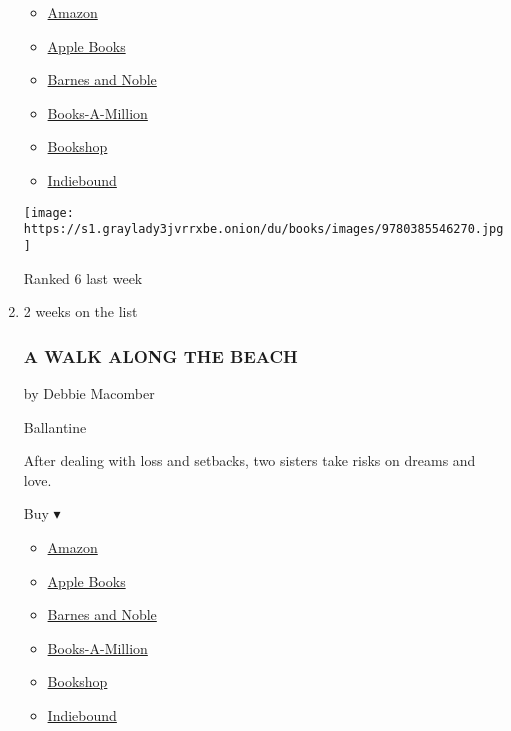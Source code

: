 \begin{enumerate}
  \begin{itemize}
  \tightlist
  \item
    \href{https://www.amazon.com/dp/0385546270?tag=NYTBSREV-20\&tag=NYTBS-20}{Amazon}
  \item
    \href{https://du-gae-books-dot-nyt-du-prd.appspot.com/buy?title=SEX+AND+VANITY\&author=Kevin+Kwan}{Apple
    Books}
  \item
    \href{https://www.anrdoezrs.net/click-7990613-11819508?url=https\%3A\%2F\%2Fwww.barnesandnoble.com\%2Fw\%2F\%3Fean\%3D9780385546270}{Barnes
    and Noble}
  \item
    \href{https://www.anrdoezrs.net/click-7990613-35140?url=https\%3A\%2F\%2Fwww.booksamillion.com\%2Fp\%2FSEX\%2BAND\%2BVANITY\%2FKevin\%2BKwan\%2F9780385546270}{Books-A-Million}
  \item
    \href{https://bookshop.org/a/3546/9780385546270}{Bookshop}
  \item
    \href{https://www.indiebound.org/book/9780385546270?aff=NYT}{Indiebound}
  \end{itemize}

  \texttt{[image: https://s1.graylady3jvrrxbe.onion/du/books/images/9780385546270.jpg]}

  Ranked 6 last week
\item
  2 weeks on the list

  \hypertarget{a-walk-along-the-beach}{%
  \subsubsection{A WALK ALONG THE BEACH}\label{a-walk-along-the-beach}}

  by Debbie Macomber

  Ballantine

  After dealing with loss and setbacks, two sisters take risks on dreams
  and love.

  Buy ▾

  \begin{itemize}
  \tightlist
  \item
    \href{https://www.amazon.com/dp/0399181369?tag=NYTBSREV-20\&tag=NYTBS-20}{Amazon}
  \item
    \href{https://du-gae-books-dot-nyt-du-prd.appspot.com/buy?title=A+WALK+ALONG+THE+BEACH\&author=Debbie+Macomber}{Apple
    Books}
  \item
    \href{https://www.anrdoezrs.net/click-7990613-11819508?url=https\%3A\%2F\%2Fwww.barnesandnoble.com\%2Fw\%2F\%3Fean\%3D9780399181368}{Barnes
    and Noble}
  \item
    \href{https://www.anrdoezrs.net/click-7990613-35140?url=https\%3A\%2F\%2Fwww.booksamillion.com\%2Fp\%2FA\%2BWALK\%2BALONG\%2BTHE\%2BBEACH\%2FDebbie\%2BMacomber\%2F9780399181368}{Books-A-Million}
  \item
    \href{https://bookshop.org/a/3546/9780399181368}{Bookshop}
  \item
    \href{https://www.indiebound.org/book/9780399181368?aff=NYT}{Indiebound}
  \end{itemize}


\end{enumerate}
